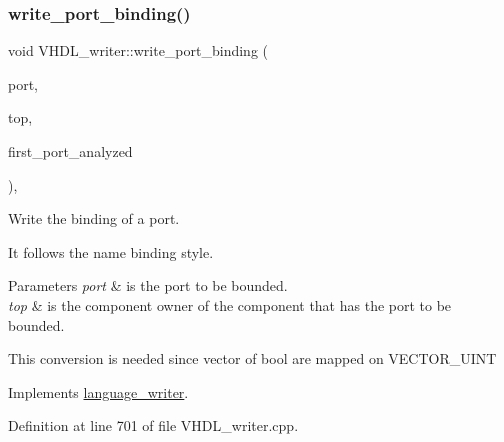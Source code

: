 \subsubsection{\texorpdfstring{write\+\_\+port\+\_\+binding()}{write\_port\_binding()}}
{\footnotesize\ttfamily void V\+H\+D\+L\+\_\+writer\+::write\+\_\+port\+\_\+binding (\begin{DoxyParamCaption}\item[{const \hyperlink{structural__objects_8hpp_a8ea5f8cc50ab8f4c31e2751074ff60b2}{structural\+\_\+object\+Ref} \&}]{port,  }\item[{const \hyperlink{structural__objects_8hpp_a8ea5f8cc50ab8f4c31e2751074ff60b2}{structural\+\_\+object\+Ref} \&}]{top,  }\item[{bool \&}]{first\+\_\+port\+\_\+analyzed }\end{DoxyParamCaption})\hspace{0.3cm}{\ttfamily [override]}, {\ttfamily [virtual]}}



Write the binding of a port. 

It follows the name binding style. 
\begin{DoxyParams}{Parameters}
{\em port} & is the port to be bounded. \\
\hline
{\em top} & is the component owner of the component that has the port to be bounded. \\
\hline
\end{DoxyParams}
This conversion is needed since vector of bool are mapped on V\+E\+C\+T\+O\+R\+\_\+\+U\+I\+NT 

Implements \hyperlink{classlanguage__writer_aae06225ee079da7199d6f7e9f35fa108}{language\+\_\+writer}.



Definition at line 701 of file V\+H\+D\+L\+\_\+writer.\+cpp.



